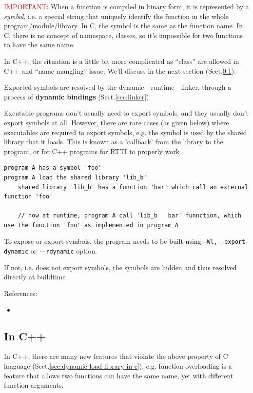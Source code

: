 \textcolor{red}{IMPORTANT: } When a function is compiled in binary form, it is
represented by a {\it symbol}, i.e. a special string that uniquely identify the
function in the whole program/module/library. In C, the symbol is the same as
the function name. In C, there is no concept of namespace, classes, so it's
impossible for two functions to have the same name.

In C++, the situation is a little bit more complicated as ``class''
are allowed in C++ and ``name mangling'' issue. We'll discuss in the
next section (Sect.\ref{sec:dynamic-load-library-in-c++}). 


Exported symbols are resolved by the dynamic - runtime - linker, through a
process of {\bf dynamic bindings} (Sect.\ref{sec:linker}).

Excutable programs don't usually need to export symbols, and they usually don't
export symbols at all. However, there are rare cases (as given below) where
executables are required to export symbols, e.g. the symbol is used by the
shared library that it loads. This is known as a 'callback' from the library to the program,
or for C++ programs for RTTI to properly work
\begin{verbatim}
program A has a symbol 'foo'
program A load the shared library 'lib_b' 
    shared library 'lib_b' has a function 'bar' which call an external function 'foo'
    
    // now at runtime, program A call 'lib_b   bar' funnction, which use the function 'foo' as implemented in program A
\end{verbatim}
To expose or export symbols, the program needs to be built using \verb!-Wl,--export-dynamic! 
or \verb!--rdynamic! option.

If not, i.e. does not export symbols, the symbols are hidden and thus resolved directly at buildtime


References:
\begin{itemize}
\item {}
\end{itemize}

\subsection{In C++}
\label{sec:dynamic-load-library-in-c++}

In C++, there are many new features that violate the above property of C
language (Sect.\ref{sec:dynamic-load-library-in-c}), e.g. function overloading
is a feature that allows two functions can have the same name, yet with
different function arguments. 

